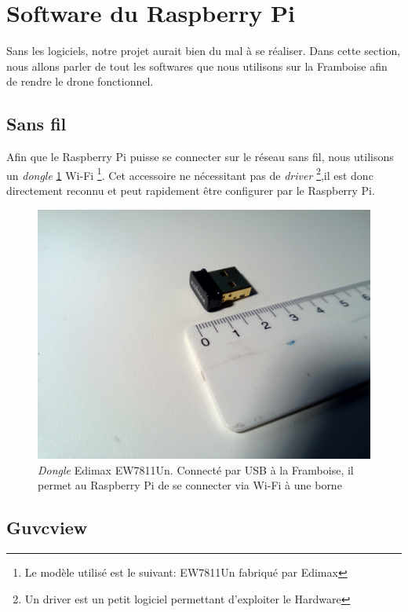\documentclass[a4paper,12pt]{report}
\begin{document}
{\section{Software du Raspberry Pi}
Sans les logiciels, notre projet aurait bien du mal à se réaliser. Dans cette section, nous allons parler de tout les softwares que nous utilisons sur la Framboise afin de rendre le drone fonctionnel.

\subsection{Sans fil}

Afin que le Raspberry Pi puisse se connecter sur le réseau sans fil, nous utilisons un \textit{dongle} \ref{Edimax} Wi-Fi \footnote{Le modèle utilisé est le suivant: EW7811Un fabriqué par Edimax}. Cet accessoire ne nécessitant pas de \textit{driver} \footnote{Un driver est un petit logiciel permettant d'exploiter le Hardware},il est donc directement reconnu et peut rapidement être configurer par le Raspberry Pi. 
\begin{figure}[!h]
\begin{center}
\includegraphics[scale=0.38, trim=300 300 300 0, clip=true]{Edimax}
\caption{\textit{Dongle} Edimax EW7811Un. Connecté par USB à la Framboise, il permet au Raspberry Pi de se connecter via Wi-Fi à une borne\label{Edimax}}
\end{center}
\end{figure} 

\subsection{Guvcview}

}
\end{document}
